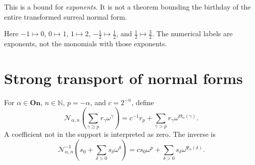 \documentclass[11pt]{article}
\theoremstyle{definition}
\theoremstyle{remark}
\newcommand{\On}{\ensuremath{\mathbf{On}}}
\newcommand{\N}{\mathbb{N}}
\newcommand{\Rect}{\mathcal{N}_{\alpha,n}}
\newcommand{\tht}{\Theta_{\alpha}}
\newcommand{\psiA}{\Psi_{\alpha}}
\begin{document}
This is a bound for \emph{exponents}. It is not a theorem bounding the
birthday of the entire transformed surreal normal form.

\begin{center}
\end{center}
Here $-1\mapsto0$, $0\mapsto1$, $1\mapsto2$,
$-\tfrac12\mapsto\tfrac12$, and
$\tfrac12\mapsto\tfrac32$. The numerical labels are exponents, not
the monomials with those exponents.

\section{Strong transport of normal forms}\label{isg:sec:transport}

\begin{definition}\label{isg:def:normalization}
For $\alpha\in\On$, $n\in\N$, $p=-\alpha$, and $c=2^{-n}$, define
\begin{equation}\label{isg:eq:N}
 \Rect\left(\sum_{\gamma\ge p}r_\gamma\omega^\gamma\right)
   =c^{-1}r_p+
     \sum_{\gamma>p}r_\gamma\omega^{\tht(\gamma)}.
\end{equation}
A coefficient not in the support is interpreted as zero. The inverse is
\begin{equation}\label{isg:eq:Ninv}
 \Rect^{-1}\left(s_0+\sum_{\delta>0}s_\delta\omega^\delta\right)
   =c s_0\omega^p+
     \sum_{\delta>0}s_\delta\omega^{\psiA(\delta)}.
\end{equation}
\end{definition}
\end{document}
